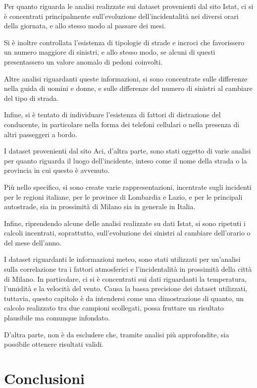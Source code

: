 \documentclass[a4paper]{article}
\newcommand{\skipline}{\vspace{0.2in}}
\begin{document}
\skipline
Per quanto riguarda le analisi realizzate sui dataset provenienti dal sito Istat, 
ci si è concentrati principalmente sull'evoluzione dell'incidentalità nei diversi orari 
della giornata, e allo stesso modo al passare dei mesi. 

Si è inoltre controllata l'esistenza di tipologie di strade e incroci che favorissero 
un numero maggiore di sinistri, e allo stesso modo, se alcuni di questi presentassero 
un valore anomalo di pedoni coinvolti. 

Altre analisi riguardanti queste informazioni, si sono concentrate sulle differenze nella 
guida di uomini e donne, e sulle differenze del numero di sinistri al cambiare 
del tipo di strada. 

Infine, si è tentato di individuare l'esistenza di fattori di distrazione del 
conducente, in particolare nella forma dei telefoni cellulari o nella presenza 
di altri passeggeri a bordo. 

\skipline
I dataset provenienti dal sito Aci, d'altra parte, sono stati oggetto di varie analisi per 
quanto riguarda il luogo dell'incidente, inteso come il nome della strada o la provincia 
in cui questo è avvenuto. 

Più nello specifico, si sono create varie rappresentazioni, incentrate sugli incidenti 
per le regioni italiane, per le province di Lombardia e Lazio, e per le 
principali autostrade, sia in prossimità di Milano sia in generale in Italia. 

Infine, riprendendo alcune delle analisi realizzate su dati Istat, si sono ripetuti i 
calcoli incentrati, soprattutto, sull'evoluzione dei sinistri al cambiare dell'orario 
o del mese dell'anno.

\skipline
I dataset riguardanti le informazioni meteo, sono stati utilizzati per un'analisi sulla 
correlazione tra i fattori atmosferici e l'incidentalità in 
prossimità della città di Milano. 
In particolare, ci si è concentrati sui dati riguardanti la temperatura, 
l'umidità e la velocità del vento. 
Causa la bassa precisione dei dataset utilizzati, tuttavia, questo capitolo è 
da intendersi come una dimostrazione di quanto, un calcolo realizzato tra due campioni 
scollegati, possa fruttare un risultato plausibile ma comunque infondato. 

D'altra parte, non è da escludere che, tramite analisi più approfondite, 
sia possibile ottenere risultati validi.

\section{Conclusioni}
\end{document}
